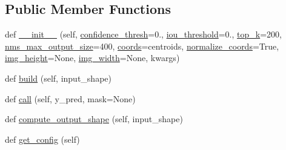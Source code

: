 \subsection*{Public Member Functions}
\begin{DoxyCompactItemize}
\item 
def \hyperlink{classkeras__utils_1_1keras__layer___decode_detections_1_1_decode_detections_ad194afad463d90638fbf361e995c7c37}{\+\_\+\+\_\+init\+\_\+\+\_\+} (self, \hyperlink{classkeras__utils_1_1keras__layer___decode_detections_1_1_decode_detections_a56313f9908567eefb31bdd7553434c62}{confidence\+\_\+thresh}=0., \hyperlink{classkeras__utils_1_1keras__layer___decode_detections_1_1_decode_detections_aa9e9991f7389356f60596453e3184bf0}{iou\+\_\+threshold}=0., \hyperlink{classkeras__utils_1_1keras__layer___decode_detections_1_1_decode_detections_af6b9c9a1dea2ff88cd16075225005405}{top\+\_\+k}=200, \hyperlink{classkeras__utils_1_1keras__layer___decode_detections_1_1_decode_detections_a187a376e17641f323dc1ce8ee21123e3}{nms\+\_\+max\+\_\+output\+\_\+size}=400, \hyperlink{classkeras__utils_1_1keras__layer___decode_detections_1_1_decode_detections_adb3a9b9790ad9bf786e7f42c2092a6e7}{coords}=\textquotesingle{}centroids\textquotesingle{}, \hyperlink{classkeras__utils_1_1keras__layer___decode_detections_1_1_decode_detections_a4641efb5a8eaefba8efa2165aa536052}{normalize\+\_\+coords}=True, \hyperlink{classkeras__utils_1_1keras__layer___decode_detections_1_1_decode_detections_a08d45ba6d76897c87e5e9ec86bd84ada}{img\+\_\+height}=None, \hyperlink{classkeras__utils_1_1keras__layer___decode_detections_1_1_decode_detections_aeeb7ac85061a9dade6ef75db8ecf3193}{img\+\_\+width}=None, kwargs)
\item 
def \hyperlink{classkeras__utils_1_1keras__layer___decode_detections_1_1_decode_detections_aee76a1042409f7e2393853887d432690}{build} (self, input\+\_\+shape)
\item 
def \hyperlink{classkeras__utils_1_1keras__layer___decode_detections_1_1_decode_detections_ac9e205b2c83a7b062ab128175cebe77b}{call} (self, y\+\_\+pred, mask=None)
\item 
def \hyperlink{classkeras__utils_1_1keras__layer___decode_detections_1_1_decode_detections_a4b270e5cfe3592ad27791b73adacf679}{compute\+\_\+output\+\_\+shape} (self, input\+\_\+shape)
\item 
def \hyperlink{classkeras__utils_1_1keras__layer___decode_detections_1_1_decode_detections_aaf52c3f762382734da0ff2ff3c3166a7}{get\+\_\+config} (self)
\end{DoxyCompactItemize}
